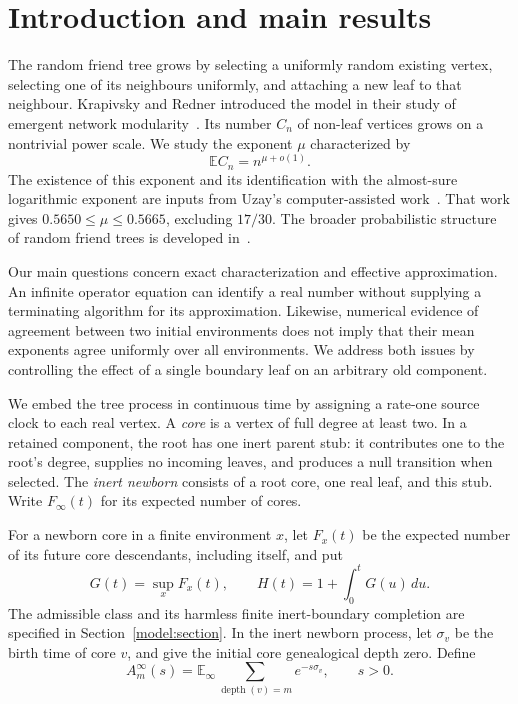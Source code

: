 \section{Introduction and main results}
\label{intro:section}

The random friend tree grows by selecting a uniformly random existing
vertex, selecting one of its neighbours uniformly, and attaching a new
leaf to that neighbour. Krapivsky and Redner introduced the model in
their study of emergent network modularity~\cite{KR}. Its number $C_n$
of non-leaf vertices grows on a nontrivial power scale. We study the
exponent $\mu$ characterized by
\[
 \mathbb E C_n=n^{\mu+o(1)}.
\]
The existence of this exponent and its identification with the
almost-sure logarithmic exponent are inputs from Uzay's
computer-assisted work~\cite{Uzay}. That work gives
$0.5650\le\mu\le0.5665$, excluding $17/30$.
The broader probabilistic structure of random friend trees is developed
in~\cite{AB}.

Our main questions concern exact characterization and effective
approximation. An infinite operator equation can identify a real number
without supplying a terminating algorithm for its approximation.
Likewise, numerical evidence of agreement between two initial
environments does not imply that their mean exponents agree uniformly
over all environments. We address both issues by controlling the
effect of a single boundary leaf on an arbitrary old component.

We embed the tree process in continuous time by assigning a rate-one
source clock to each real vertex. A \emph{core} is a vertex of full
degree at least two. In a retained component, the root has one inert
parent stub: it contributes one to the root's degree, supplies no
incoming leaves, and produces a null transition when selected. The
\emph{inert newborn} consists of a root core, one real leaf, and this
stub. Write $F_\infty(t)$ for its expected number of cores.

For a newborn core in a finite environment $x$, let $F_x(t)$ be the
expected number of its future core descendants, including itself, and
put
\[
 G(t)=\sup_xF_x(t),\qquad H(t)=1+\int_0^tG(u)\,du.
\]
The admissible class and its harmless finite inert-boundary completion
are specified in Section~\ref{model:section}. In the inert newborn
process, let $\sigma_v$ be the birth time of core $v$, and give the
initial core genealogical depth zero. Define
\[
 A_m^\infty(s)=\mathbb E_\infty
   \sum_{\operatorname{depth}(v)=m}e^{-s\sigma_v},\qquad s>0.
\]

